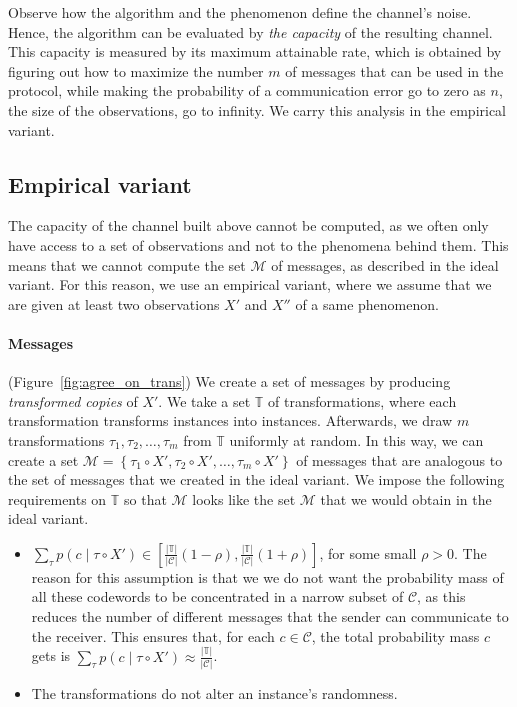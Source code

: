 Observe how the algorithm and the phenomenon define the channel's noise. Hence, the algorithm can be evaluated by \emph{the capacity} of the resulting channel. This capacity is measured by its maximum attainable rate, which is obtained by figuring out how to maximize the number $m$ of messages that can be used in the protocol, while making the probability of a communication error go to zero as $n$, the size of the observations, go to infinity. We carry this analysis in the empirical variant.

\subsection{Empirical variant}

The capacity of the channel built above cannot be computed, as we often only have access to a set of observations and not to the phenomena behind them. This means that we cannot compute the set $\mathcal{M}$ of messages, as described in the ideal variant. For this reason, we use an empirical variant, where we assume that we are given at least two observations $X'$ and $X''$ of a same phenomenon.

\paragraph{Messages} (Figure~\ref{fig:agree_on_trans}) We create a set of messages by producing \emph{transformed copies} of $X'$. We take a set $\mathbb{T}$ of transformations, where each transformation transforms instances into instances. Afterwards, we draw $m$ transformations  $\tau_1, \tau_2, \ldots, \tau_m$ from $\mathbb{T}$ uniformly at random. In this way, we can create a set $\mathcal{M} = \left\{\tau_1 \circ X', \tau_2 \circ X', \ldots, \tau_m \circ X'\right\}$ of messages that are analogous to the set of messages that we created in the ideal variant. We impose the following requirements on $\mathbb{T}$ so that $\mathcal{M}$ looks like the set $\mathcal{M}$ that we would obtain in the ideal variant.

\begin{itemize}
\item $\sum_{\tau} p(c \mid \tau \circ X') \in \left[\frac{\left|\mathbb{T}\right|}{\left|\mathcal{C}\right|}(1 - \rho), \frac{\left|\mathbb{T}\right|}{\left|\mathcal{C}\right|}(1 + \rho)\right]$, for some small $\rho > 0$. The reason for this assumption is that we we do not want the probability mass of all these codewords to be concentrated in a narrow subset of $\mathcal{C}$, as this reduces the number of different messages that the sender can communicate to the receiver. This ensures that, for each $c \in \mathcal{C}$, the total probability mass $c$ gets is $\sum_{\tau} p(c \mid \tau \circ X') \approx \frac{\left|\mathbb{T}\right|}{\left|\mathcal{C}\right|}$.
\item The transformations do not alter an instance's randomness. 
\end{itemize}

